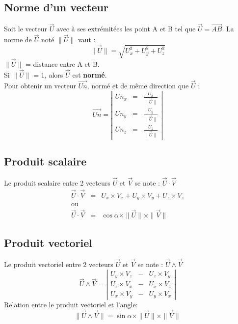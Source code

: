 \documentclass{report}
\begin{document}
\subsection{Norme d'un vecteur}
Soit le vecteur $\vec{U}$ avec à ses extrémitées les point A et B tel que $\vec{U} = \vec{AB}$.
La norme de $\vec{U}$ noté $\|\vec{U}\|$ vaut :
\[
  \|\vec{U}\| = \sqrt{U_{x}^{2} + U_{y}^{2} + U_{z}^{2}}
\]
$\|\vec{U}\|$ = distance entre A et B.\\
Si $\|\vec{U}\|$ = 1, alors $\vec{U}$ est \textbf{normé}.\\
Pour obtenir un vecteur $\overrightarrow{Un}$, normé et de même direction que $\vec{U}$ :
\[
\overrightarrow{Un} = 
\left |
\begin{array}{rcl}
    Un_x &=& \frac{U_x}{\|\vec{U}\|}\\
    Un_y &=& \frac{U_y}{\|\vec{U}\|}\\
    Un_z &=& \frac{U_z}{\|\vec{U}\|}
\end{array}
\right |
\]
\subsection{Produit scalaire}
Le produit scalaire entre 2 vecteurs $\vec{U}$ et $\vec{V}$ se note : $\vec{U}\cdot\vec{V}$
\[
\begin{array}{rcl}
\vec{U} \cdot \vec{V} &=& U_{x} \times V_{x} + U_{y} \times V_{y} + U_{z} \times V_{z}\\
\text{ou} \\
\vec{U} \cdot \vec{V} &=& \cos \alpha \times \|\vec{U}\| \times \|\vec{V}\|
\end{array}
\]

\subsection{Produit vectoriel}
Le produit vectoriel entre 2 vecteurs $\vec{U}$ et $\vec{V}$ se note : $\vec{U} \wedge \vec{V}$
\[
\vec{U} \wedge \vec{V} =
\left|
\begin{array}{rcl}
  U_y \times V_{z} &-& U_{z} \times V_y\\
  U_z \times V_{x} &-& U_{x} \times V_z\\
  U_x \times V_{y} &-& U_{y} \times V_x
\end{array}
\right|
\]
Relation entre le produit vectoriel et l'angle:
\[
\|\vec{U} \wedge \vec{V}\| = \sin \alpha \times \|\vec{U}\| \times \|\vec{V}\|
\]
\end{document}
